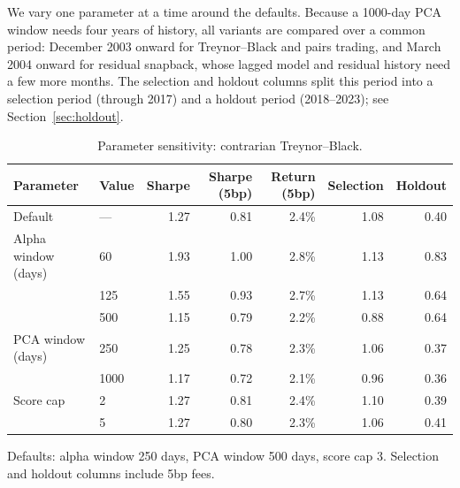 \documentclass[11pt,letterpaper]{article}
\begin{document}
We vary one parameter at a time around the defaults. Because a 1000-day PCA window needs four
years of history, all variants are compared over a common period: December 2003 onward for
Treynor--Black and pairs trading, and March 2004 onward for residual snapback, whose lagged
model and residual history need a few more months. The selection and holdout columns split this
period into a selection period (through 2017) and a holdout period (2018--2023); see
Section~\ref{sec:holdout}.

\begin{table}[!htbp]
    \centering
    \caption{Parameter sensitivity: contrarian Treynor--Black.}
    \label{tab:sensitivity-tb}
    \begin{tabular}{L{0.25}L{0.1}R{0.13}R{0.13}R{0.13}R{0.13}R{0.13}}
        \toprule
        Parameter & Value & Sharpe & Sharpe (5bp) & Return (5bp) & Selection & Holdout \\
        \midrule
        Default & --- & 1.27 & 0.81 & 2.4\% & 1.08 & 0.40 \\
        Alpha window (days) & 60 & 1.93 & 1.00 & 2.8\% & 1.13 & 0.83 \\
        & 125 & 1.55 & 0.93 & 2.7\% & 1.13 & 0.64 \\
        & 500 & 1.15 & 0.79 & 2.2\% & 0.88 & 0.64 \\
        PCA window (days) & 250 & 1.25 & 0.78 & 2.3\% & 1.06 & 0.37 \\
        & 1000 & 1.17 & 0.72 & 2.1\% & 0.96 & 0.36 \\
        Score cap & 2 & 1.27 & 0.81 & 2.4\% & 1.10 & 0.39 \\
        & 5 & 1.27 & 0.80 & 2.3\% & 1.06 & 0.41 \\
        \bottomrule
    \end{tabular}
    \par\smallskip\noindent
    Defaults: alpha window 250 days, PCA window 500 days, score cap 3. Selection and holdout
    columns include 5bp fees.
\end{table}
\end{document}
